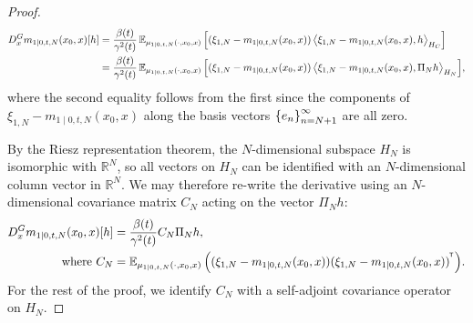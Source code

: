\begin{proof}
  \begin{align*}
    D_{x}^{G} m_{1 \mid 0, t, N}(x_{0}, x)[h] &=\frac{\beta(t)}{\gamma^{2}(t)} \mathop{\mathbb{E}_{\mu_{1 \mid 0, t, N}(\cdot, x_{0}, x)}}\qty[(\xi_{1, N} - m_{1 \mid 0, t, N}(x_{0}, x)) \ev{\xi_{1, N} - m_{1 \mid 0, t, N}(x_{0}, x), h}_{H_{C}}] \\
    &=\frac{\beta(t)}{\gamma^{2}(t)} \mathop{\mathbb{E}_{\mu_{1 \mid 0, t, N}(\cdot, x_{0}, x)}}\qty[(\xi_{1, N} - m_{1 \mid 0, t, N}(x_{0}, x)) \ev{\xi_{1, N} - m_{1 \mid 0, t, N}(x_{0}, x), \Pi_{N} h}_{H_{N}}],
  \end{align*}
  where the second equality follows from the first since the components of \(\xi_{1, N} - m_{1 \mid 0, t, N}(x_{0}, x)\) along the basis vectors \(\qty{e_{n}}_{n=N+1}^{\infty}\) are all zero.

  By the Riesz representation theorem, the \(N\)-dimensional subspace \(H_{N}\) is isomorphic with \(\mathbb{R}^{N}\), so all vectors on \(H_{N}\) can be identified with an \(N\)-dimensional column vector in \(\mathbb{R}^{N}\). We may therefore re-write the derivative using an \(N\)-dimensional covariance matrix \(C_{N}\) acting on the vector \(\Pi_{N} h\):
  \begin{align}
    D^{G}_{x} m_{1 \mid 0, t, N}(x_{0}, x)[h] &= \frac{\beta(t)}{\gamma^{2}(t)} C_{N} \Pi_{N} h, \label{eqn:dxmt}\\
    \text{ where } C_{N} &= \mathop{\mathbb{E}_{\mu_{1 \mid 0, t, N}(\cdot, x_{0}, x)}}\qty((\xi_{1, N} - m_{1 \mid 0, t, N}(x_{0}, x))(\xi_{1, N} - m_{1 \mid 0, t, N}(x_{0}, x))^{^{\mkern-1.5mu\mathsf{T}}}). \notag
  \end{align}
  For the rest of the proof, we identify \(C_{N}\) with a self-adjoint covariance operator on \(H_{N}\).


\end{proof}

